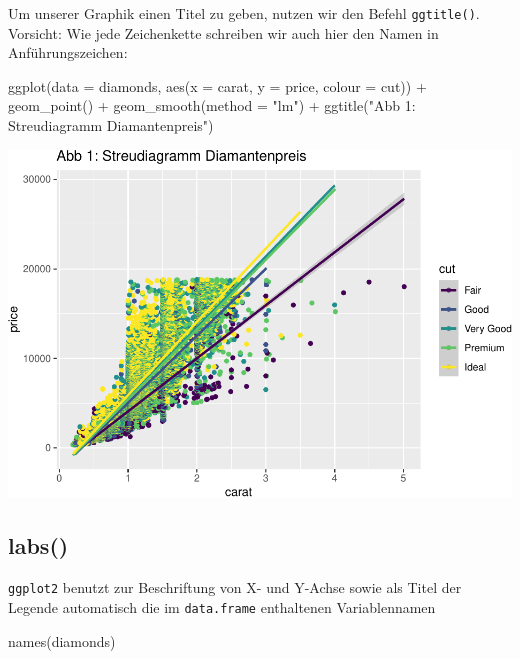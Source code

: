 \documentclass[
]{book}
\newenvironment{Shaded}{\begin{snugshade}}{\end{snugshade}}
\newcommand{\AttributeTok}[1]{\textcolor[rgb]{0.77,0.63,0.00}{#1}}
\newcommand{\FunctionTok}[1]{\textcolor[rgb]{0.00,0.00,0.00}{#1}}
\newcommand{\NormalTok}[1]{#1}
\newcommand{\SpecialCharTok}[1]{\textcolor[rgb]{0.00,0.00,0.00}{#1}}
\newcommand{\StringTok}[1]{\textcolor[rgb]{0.31,0.60,0.02}{#1}}
\begin{document}
Um unserer Graphik einen Titel zu geben, nutzen wir den Befehl \texttt{ggtitle()}. Vorsicht: Wie jede Zeichenkette schreiben wir auch hier den Namen in Anführungszeichen:

\begin{Shaded}
\begin{Highlighting}[]
\FunctionTok{ggplot}\NormalTok{(}\AttributeTok{data =}\NormalTok{ diamonds, }\FunctionTok{aes}\NormalTok{(}\AttributeTok{x =}\NormalTok{ carat, }\AttributeTok{y =}\NormalTok{ price, }\AttributeTok{colour =}\NormalTok{ cut)) }\SpecialCharTok{+}
  \FunctionTok{geom\_point}\NormalTok{() }\SpecialCharTok{+}
  \FunctionTok{geom\_smooth}\NormalTok{(}\AttributeTok{method =} \StringTok{"lm"}\NormalTok{) }\SpecialCharTok{+}
  \FunctionTok{ggtitle}\NormalTok{(}\StringTok{"Abb 1: Streudiagramm Diamantenpreis"}\NormalTok{)}
\end{Highlighting}
\end{Shaded}

\includegraphics{CFH_R_bookdown_files/figure-latex/unnamed-chunk-173-1.pdf}

\hypertarget{labs}{%
\subsection{labs()}\label{labs}}

\texttt{ggplot2} benutzt zur Beschriftung von X- und Y-Achse sowie als Titel der Legende automatisch die im \texttt{data.frame} enthaltenen Variablennamen

\begin{Shaded}
\begin{Highlighting}[]
\FunctionTok{names}\NormalTok{(diamonds)}
\end{Highlighting}
\end{Shaded}
\end{document}
